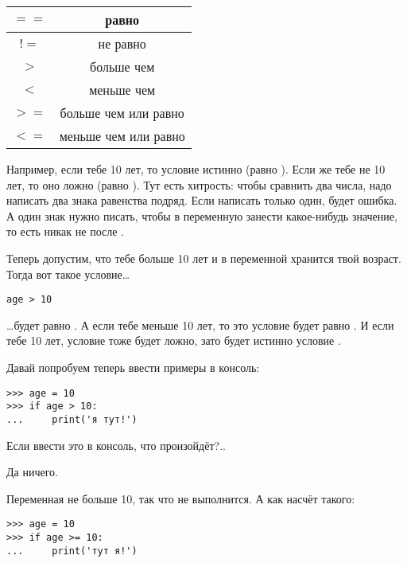 \begin{center}
\begin{tabular}{|c|c|}
\hline
$==$ & равно \\
\hline
$!=$ & не равно \\
\hline
$>$ & больше чем \\
\hline
$<$ & меньше чем \\
\hline
$>=$ & больше чем или равно \\
\hline
$<=$ & меньше чем или равно \\
\hline
\end{tabular}
\end{center}

Например, если тебе 10 лет, то условие  истинно (равно ). Если же тебе не 10 лет, то оно ложно (равно ). Тут есть хитрость: чтобы сравнить два числа, надо написать два знака равенства подряд. Если написать только один, будет ошибка. А один знак нужно писать, чтобы в переменную занести какое-нибудь значение, то есть никак не после .

Теперь допустим, что тебе больше 10 лет и в переменной  хранится твой возраст. Тогда вот такое условие…

\begin{listing}
\begin{verbatim}
age > 10
\end{verbatim}
\end{listing}

…будет равно . А если тебе меньше 10 лет, то это условие будет равно . И если тебе 10 лет, условие тоже будет ложно, зато будет истинно условие .

Давай попробуем теперь ввести примеры в консоль:

\begin{listing}
\begin{verbatim}
>>> age = 10
>>> if age > 10:
...     print('я тут!')
\end{verbatim}
\end{listing}

Если ввести это в консоль, что произойдёт?..

Да ничего.

Переменная  не больше 10, так что  не выполнится. А как насчёт такого:

\begin{listing}
\begin{verbatim}
>>> age = 10
>>> if age >= 10:
...     print('тут я!')
\end{verbatim}
\end{listing}

